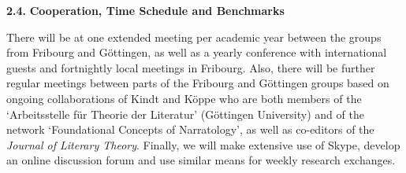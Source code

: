 
\vspace{.2cm}
{\textbf{2.4.  }}\textbf{Cooperation, Time Schedule and Benchmarks}
\vspace{.2cm}

\noindent There will be at one extended meeting per academic year between the groups from Fribourg and G\"ottingen, as well as a yearly conference with international guests and fortnightly local meetings in Fribourg. Also, there will be further regular meetings between parts of the Fribourg and G\"ottingen groups based on ongoing collaborations of Kindt and K\"oppe who are both members of the `Arbeitsstelle f\"ur Theorie der Literatur' (G\"ottingen University) and of the network `Foundational Concepts of Narratology', as well as co-editors of the \emph{Journal of Literary Theory}. Finally, we will make extensive use of Skype, develop an online discussion forum and use similar means for weekly research exchanges.

\vspace{.5cm}
\setlength{\parindent}{-20pt}
\setlength{\parindent}{10pt}

